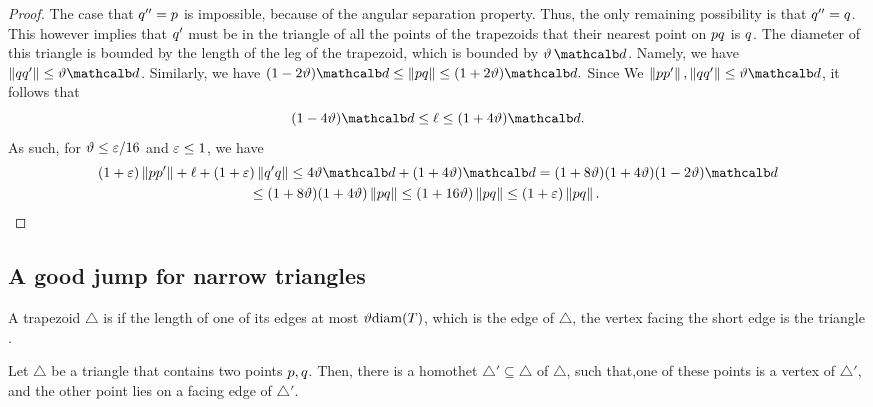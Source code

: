 \documentclass[12pt]{article}%
\begin{document}
\begin{proof}
    The case that $q''=p$ is impossible, because of the angular
    separation property. Thus, the only remaining possibility is that
    $q'' = q$. This however implies that $q'$ must be in the
    triangle of all the points of the trapezoids that their nearest
    point on $p q$ is $q$. The diameter of this triangle is
    bounded by the length of the leg of the trapezoid, which is
    bounded by $\epsA \, \diamC$. Namely, we have
    $\dY{\pb}{\pb'} \leq \epsA \diamC$. Similarly, we have
    \begin{math}
        (1 -  2\epsA) \diamC%
        \leq%
        \dY{\pa}{\pb}
        \leq%
        (1+2\epsA)\diamC.        
    \end{math}
    Since 
    We  $\dY{\pa}{\pa'}, \dY{\pb}{\pb'} \leq \epsA \diamC$, it follows
    that
    \begin{equation*}
        (1-4\epsA) \diamC%
        \leq%
        \ell%
        \leq%
        (1+4\epsA)\diamC.
    \end{equation*}
    As such, for $\vartheta \leq \varepsilon/16$ and $\varepsilon \leq 1$, we have
    \begin{align*}
      (1+\eps)\dY{\pa}{\pa'} + \ell + (1+\eps)
      \dY{\pb'}{\pb}
      &\leq%
        4 \epsA \diamC + (1+4\epsA)\diamC
        =%
        (1+8\epsA)(1+4\epsA) (1 -  2\epsA) \diamC
      \\&
      \hspace{-1cm}\leq%
      (1+8\epsA)(1+4\epsA) \dY{\pa}{\pb}
      \leq 
      (1+16\epsA) \dY{\pa}{\pb}
      \leq
      (1+\eps) \dY{\pa}{\pb}.
    \end{align*}
\end{proof}

\subsection{A good jump for narrow triangles}

A trapezoid $\triangle$ is  if the length of one
of its edges at most $\epsA \diamX{\Trap}$, which is the 
edge of $\triangle$, the vertex facing the short edge is the triangle
.

\begin{lemma}
    Let $\triangle$ be a triangle that contains two points $p,
    q$. Then, there is a homothet $\triangle'\subseteq \triangle$ of
    $\triangle$, such that,one of these points is a vertex of
    $\triangle'$, and the other point lies on a facing edge of
    $\triangle'$.
\end{lemma}
\end{document}
